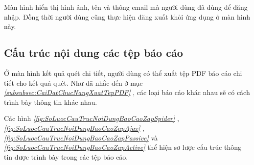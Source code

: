Màn hình hiển thị hình ảnh, tên và thông email mà người dùng đã dùng để đăng nhập.
Đồng thời người dùng cũng thực hiện đăng xuất khỏi ứng dụng ở màn hình này.

\subsection{Cấu trúc nội dung các tệp báo cáo}

\tab Ở màn hình kết quả quét chi tiết, người dùng có thể xuất tệp PDF báo cáo chi tiết cho kết quả quét.
Như đã nhắc đến ở mục \textit{\ref{subsubsec:CaiDatChucNangXuatTepPDF} }, 
các loại báo cáo khác nhau sẽ có cách trình bày thông tin khác nhau.

Các hình \textit{\ref{fig:SoLuocCauTrucNoiDungBaoCaoZapSpider} }
, \textit{\ref{fig:SoLuocCauTrucNoiDungBaoCaoZapAjax} }
, \textit{\ref{fig:SoLuocCauTrucNoiDungBaoCaoZapPassive} }
và \textit{\ref{fig:SoLuocCauTrucNoiDungBaoCaoZapActive} } 
thể hiện sơ lược cấu trúc thông tin được trình bày trong các tệp báo cáo.

